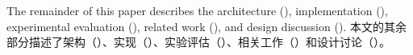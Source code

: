 The remainder of this paper describes the architecture (), implementation (), experimental evaluation (), related work (), and design discussion ().
本文的其余部分描述了架构（）、实现（）、实验评估（）、相关工作（）和设计讨论（）。
